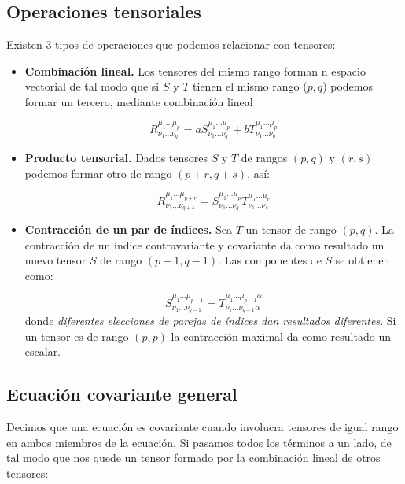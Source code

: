 \documentclass[12pt,a4paper]{book}
\numberwithin{equation}{section}
\numberwithin{figure}{section}
\begin{document}
\subsection{Operaciones tensoriales}

Existen 3 tipos de operaciones que podemos relacionar con tensores:

\begin{itemize}
\item \textbf{Combinación lineal.} Los tensores del mismo rango forman n espacio vectorial de tal modo que si $S$ y $T$ tienen el mismo rango ($p,q$) podemos formar un tercero, mediante combinación lineal

\begin{equation}
R^{\mu_1 \ldots \mu_p}_{\nu_1\ldots\nu_q} = a S^{\mu_1 \ldots \mu_p}_{\nu_1\ldots\nu_q} + b T^{\mu_1 \ldots \mu_p}_{\nu_1\ldots\nu_q}
\end{equation}

\item \textbf{Producto tensorial.} Dados tensores $S$ y $T$ de rangos $(p,q)$ y $(r,s)$ podemos formar otro de rango $(p+r,q+s)$, así:

\begin{equation}
R^{\mu_1 \ldots \mu_{p+r}}_{\nu_1\ldots\nu_{q+s}} =S ^{\mu_1 \ldots \mu_p}_{\nu_1\ldots\nu_q}T^{\mu_1 \ldots \mu_r}_{\nu_1\ldots\nu_s}
\end{equation}

\item  \textbf{Contracción de un par de índices.} Sea $T$ un tensor de rango $(p,q)$. La contracción de un índice contravariante y covariante da como resultado un nuevo tensor $S$ de rango $(p-1,q-1)$. Las componentes de $S$ se obtienen como: 

\begin{equation}
S^{\mu_1 \ldots \mu_{p-1}}_{\nu_1\ldots\nu_{q-1}} =T ^{\mu_1 \ldots \mu_{p-1}\alpha}_{\nu_1\ldots\nu_{q-1}\alpha}
\end{equation}
donde \textit{diferentes elecciones de parejas de índices dan resultados diferentes}. Si un tensor es de rango $(p,p)$ la contracción maximal da como resultado un escalar.
\end{itemize}

\subsection{Ecuación covariante general}

Decimos que una ecuación es covariante cuando involucra tensores de igual rango en ambos miembros de la ecuación. Si pasamos todos los términos a un lado, de tal modo que nos quede un tensor formado por la combinación lineal de otros tensores:
\end{document}
